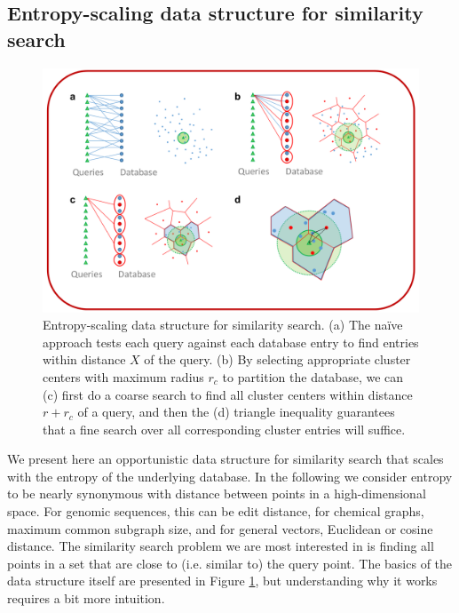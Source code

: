 \documentclass[review,preprint,12pt]{elsarticle}
\theoremstyle{definition}
\theoremstyle{remark}
\numberwithin{equation}{section}
\begin{document}
\subsection{Entropy-scaling data structure for similarity search}
\begin{figure}[btp]
    \centering
    \includegraphics[width=1\textwidth]{assets/dataStructure}
    \caption{ Entropy-scaling data structure for similarity search. %
            (a) The na\"ive approach tests each query against each database entry to find entries within distance $X$  of the query. %
            (b) By selecting appropriate cluster centers with maximum radius $r_c$ to partition the database, we can (c) first do a coarse search to find all cluster centers within distance $r+r_c$ of a query, and then the (d) triangle inequality guarantees that a fine search over all corresponding cluster entries will suffice.}
    \label{fig:dataStructure}
\end{figure}

We present here an opportunistic data structure for similarity search that scales with the entropy of the underlying database.
In the following we consider entropy to be nearly synonymous with distance between points in a high-dimensional space.
For genomic sequences, this can be edit distance, for chemical graphs, maximum common subgraph size, and for general vectors, Euclidean or cosine distance.
The similarity search problem we are most interested in is finding all points in a set that are close to (i.e. similar to) the query point.
The basics of the data structure itself are presented in Figure \ref{fig:dataStructure}, but understanding why it works requires a bit more intuition.
\end{document}
